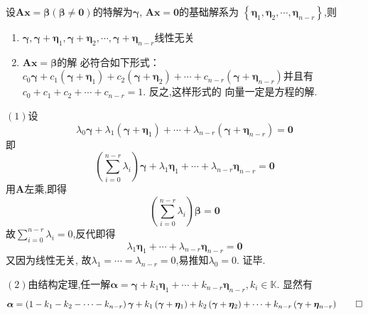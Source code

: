 \begin{green}
\begin{corollary}[对解的一些刻画]\label{cor:对解的一些刻画}
    设$\bm{Ax} = \bm{\beta}\left(
        \bm{\beta} \neq \bm{0}
    \right)$的特解为$\bm{\gamma}$,
    $\bm{Ax} = \bm{0}$的基础解系为
    $\left\{\bm{\eta}_1,\bm{\eta}_2,\cdots
    ,\bm{\eta}_{n - r}\right\}$,则
    \begin{enumerate}[label=\textup{(\arabic*)}]
        \item $\bm{\gamma},\bm{\gamma}+
        \bm{\eta}_1,\bm{\gamma}+\bm{\eta}_2,\cdots,
        \bm{\gamma}+\bm{\eta}_{n - r}
        $线性无关
        \item $\bm{Ax}=\bm{\beta}$的解
        必符合如下形式：
        $c_0\bm{\gamma}+c_1\left(
            \bm{\gamma}+\bm{\eta}_1
        \right)+c_2\left(
            \bm{\gamma}+\bm{\eta}_2
        \right)+\cdots+
        c_{n - r}\left(\bm{\gamma}+
        \bm{\eta}_{n - r}\right)
        $并且有
        $c_0+c_1+c_2+\cdots+c_{n - r}=1$.
        反之,这样形式的
        向量一定是方程的解.
    \end{enumerate}
\end{corollary}
\begin{Proof}
$(1)$设
\[
\lambda_0\bm{\gamma}
+\lambda_1\left(
            \bm{\gamma}+\bm{\eta}_1
        \right)+\cdots+
        \lambda_{n - r}\left(\bm{\gamma}+
        \bm{\eta}_{n - r}\right)=\bm{0}
\]
即
\[
\left(\sum_{i=0}^{n-r}
\lambda_i\right)\bm{\gamma}+\lambda_1\bm{\eta}_1+\cdots
+\lambda_{n-r}\bm{\eta}_{n-r}=
\bm{0}
\]
用$\bm{A}$左乘,即得
\[
\left(\sum_{i=0}^{n-r}\lambda_{i}\right)\bm{\beta}=\bm{0}
\]
故$\displaystyle
\sum_{i=0}^{n-r}\lambda_i=0$,反代即得
\[
\lambda_1\bm{\eta}_1+\cdots
+\lambda_{n-r}\bm{\eta}_{n-r}=
\bm{0}
\]
又因为线性无关,
故$\lambda_1=\cdots=\lambda_{n-r}=0$,易推知$\lambda_0=0$.
证毕.

$(2)$由结构定理,任一解$\bm{\alpha}=
\bm{\gamma}+
        k_1\bm{\eta}_1+\cdots
        +k_{n - r}\bm{\eta}_{n - r},k_i\in \mathbb{K}.
$
显然有
\[
\bm{\alpha}=\left(1-k_1-k_2-\cdots-k_{n-r}\right)
\bm{\gamma}+k_1\left(\bm{\gamma}+\bm{\eta}_1\right)
+k_2\left(\bm{\gamma}+\bm{\eta}_2\right)+
\cdots+k_{n-r}\left(\bm{\gamma}+\bm{\eta}_{n-r}\right)
\qedhere
\]
\end{Proof}
\end{green}
